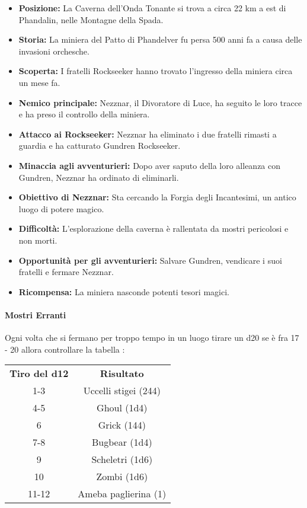 \documentclass{article}
\begin{document}
\begin{itemize}
    \item \textbf{Posizione:} La Caverna dell’Onda Tonante si trova a circa 22 km a est di Phandalin, nelle Montagne della Spada.
    \item \textbf{Storia:} La miniera del Patto di Phandelver fu persa 500 anni fa a causa delle invasioni orchesche.
    \item \textbf{Scoperta:} I fratelli Rockseeker hanno trovato l’ingresso della miniera circa un mese fa.
    \item \textbf{Nemico principale:} Nezznar, il Divoratore di Luce, ha seguito le loro tracce e ha preso il controllo della miniera.
    \item \textbf{Attacco ai Rockseeker:} Nezznar ha eliminato i due fratelli rimasti a guardia e ha catturato Gundren Rockseeker.
    \item \textbf{Minaccia agli avventurieri:} Dopo aver saputo della loro alleanza con Gundren, Nezznar ha ordinato di eliminarli.
    \item \textbf{Obiettivo di Nezznar:} Sta cercando la Forgia degli Incantesimi, un antico luogo di potere magico.
    \item \textbf{Difficoltà:} L'esplorazione della caverna è rallentata da mostri pericolosi e non morti.
    \item \textbf{Opportunità per gli avventurieri:} Salvare Gundren, vendicare i suoi fratelli e fermare Nezznar.
    \item \textbf{Ricompensa:} La miniera nasconde potenti tesori magici.
\end{itemize}

    \paragraph*{Mostri Erranti}
        Ogni volta che si fermano per troppo tempo in un luogo tirare un d20 se è fra 17 - 20 allora controllare la tabella : \\
        \begin{tabular}{|c|c|}
            \hline
            \textbf{Tiro del d12} & \textbf{Risultato} \\ 
            1-3 & Uccelli stigei (244) \\
            4-5 & Ghoul (1d4) \\
            6   & Grick (144) \\
            7-8 & Bugbear (1d4) \\
            9   & Scheletri (1d6) \\
            10  & Zombi (1d6) \\
            11-12 & Ameba paglierina (1) \\
            \hline
        \end{tabular}
    
\end{document}
